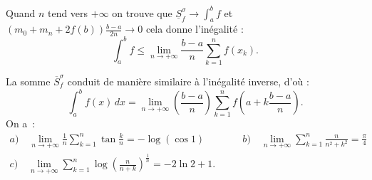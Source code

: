 {{Quand $n$ tend vers $+\infty$ on trouve que $\underline{S}_{f}^{\sigma} \to \int_a^b f$
et $(m_0+m_n+2f(b)) \frac{b-a}{2n}\to 0$ cela donne l'inégalité :
$$\int_a^b f \le \lim_{n\rightarrow+\infty} \frac{b-a}{n}\sum_{k=1}^{n} f(x_k).$$

La somme $\overline{S}_{f}^{\sigma}$ conduit de manière similaire à l'inégalité inverse,
d'o\`u :
\begin{equation*}
\int_{a}^{b} f(x)\,dx =
\lim_{n\rightarrow+\infty}\left(\frac{b-a}{n}\right)
\sum_{k=1}^{n}f\left(a+k\frac{b-a}{n}\right).
\end{equation*}
On a~:
\begin{eqnarray*}
a)\quad\lim_{n\rightarrow+\infty}
\frac{1}{n}\sum_{k=1}^{n}\tan\frac{k}{n} = -\log(\cos 1)
\quad\quad\quad &
b)\quad\lim_{n\rightarrow+\infty}\sum_{k=1}^{n}\frac{n}{n^2+k^2} =
\frac{\pi}{4} \quad\quad\quad\\
c)\quad\lim_{n\rightarrow+\infty}\sum_{k=1}^{n}\log\left(\frac{n}{n+k}\right)^{\frac{1}{n}}
= -2\ln 2 + 1. &
\end{eqnarray*}
}
}
